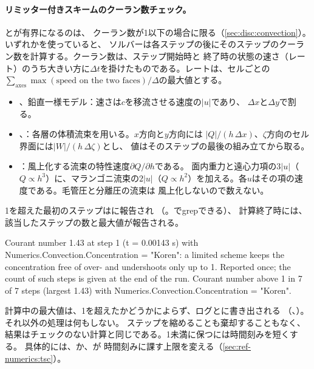 \paragraph{リミッター付きスキームのクーラン数チェック。} とが有界になるのは、
クーラン数が1以下の場合に限る（\cref{sec:disc:convection}）。いずれかを使っていると、
ソルバーは各ステップの後にそのステップのクーラン数を計算する。クーラン数は、ステップ開始時と
終了時の状態の速さ（レート）のうち大きい方に$\Delta t$を掛けたものである。レートは、セルごとの
$\sum_\text{axes} \max(\text{speed on the two faces})/\Delta$の最大値とする。
\begin{itemize}
  \item {}、鉛直一様モデル：速さは$c$を移流させる速度の$|u|$であり、
    $\Delta x$と$\Delta y$で割る。
  \item {}、：各層の体積流束を用いる。$x$方向と$y$方向には
    $|Q|/(h\,\Delta x)$、$\zeta$方向のセル界面には$|W|/(h\,\Delta\zeta)$とし、
    値はそのステップの最後の組み立てから取る。
  \item {}：風上化する流束の特性速度$\partial Q/\partial h$である。
    面内重力と遠心力項の$3|u|$（$Q \propto h^3$）に、マランゴニ流束の$2|u|$（$Q \propto
    h^2$）を加える。各$u$はその項の速度である。毛管圧と分離圧の流束は
    風上化しないので数えない。
\end{itemize}
1を超えた最初のステップはに報告され
（。でgrepできる）、
計算終了時には、該当したステップの数と最大値が報告される。
\begin{plain}
Courant number 1.43 at step 1 (t = 0.00143 s) with Numerics.Convection.Concentration = "Koren": a limited scheme keeps the concentration free of over- and undershoots only up to 1. Reported once; the count of such steps is given at the end of the run.
Courant number above 1 in 7 of 7 steps (largest 1.43) with Numerics.Convection.Concentration = "Koren".
\end{plain}
計算中の最大値は、1を超えたかどうかによらず、ログとに書き出される
（、）。それ以外の処理は何もしない。
ステップを縮めることも棄却することもなく、結果はチェックのない計算と同じである。1未満に保つには時間刻みを短くする。
具体的には、か、が
時間刻みに課す上限を変える（\cref{sec:ref-numerics:tsc}）。

